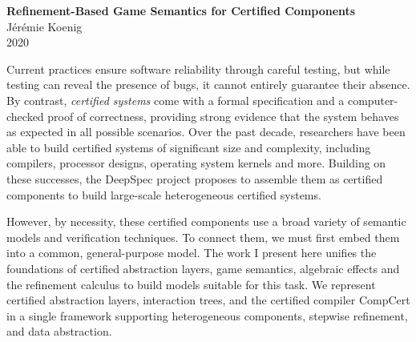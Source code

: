 \documentclass[11pt,oneside,draft]{book}
\theoremstyle{definition}
\newcommand{\gcat}{\mathcal{G}_{\sqsubseteq}}
\begin{document}
\frontmatter

\thispagestyle{empty}
\rule{0pt}{5em}

\begin{center}
  \textbf{Refinement-Based Game Semantics for Certified Components}
  \\
  J\'er\'emie Koenig
  \\
  2020
\end{center}

Current practices ensure software reliability through careful testing,
but while testing can reveal the presence of bugs,
it cannot entirely guarantee their absence.
By contrast,
\emph{certified systems} come with a formal specification and
a computer-checked proof of correctness,
providing strong evidence that
the system behaves as expected in all possible scenarios.
Over the past decade,
researchers have been able to build certified systems
of significant size and complexity,
including compilers, processor designs, operating system kernels and more.
Building on these successes,
the DeepSpec project proposes to assemble them as certified components
to build large-scale heterogeneous certified systems.

However, by necessity,
these certified components use a broad variety of
semantic models and verification techniques.
To connect them,
we must first embed them into a common, general-purpose model.
The work I present here
unifies the foundations of
certified abstraction layers,
game semantics,
algebraic effects and
the refinement calculus
to build models suitable for this task.
We represent certified abstraction layers,
interaction trees,
and the certified compiler CompCert
in a single framework supporting
heterogeneous components,
stepwise refinement, and
data abstraction.


\end{document}
